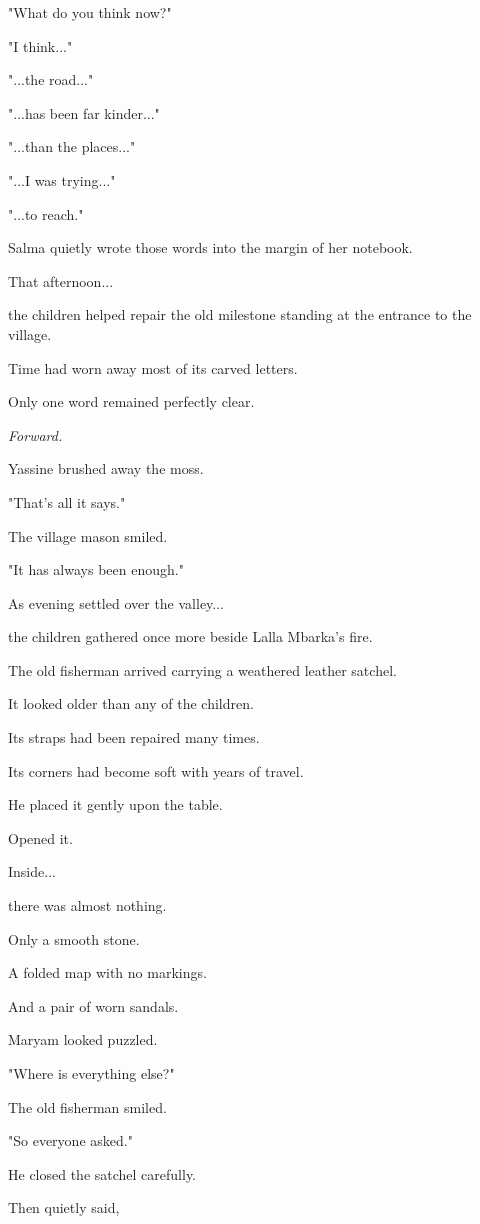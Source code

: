 \documentclass[12pt,openany]{book}
\begin{document}
"What do you think now?"

"I think..."

"...the road..."

"...has been far kinder..."

"...than the places..."

"...I was trying..."

"...to reach."

Salma quietly wrote those words into the margin of her notebook.

That afternoon...

the children helped repair the old milestone standing at the entrance to the village.

Time had worn away most of its carved letters.

Only one word remained perfectly clear.

\emph{Forward.}

Yassine brushed away the moss.

"That's all it says."

The village mason smiled.

"It has always been enough."

As evening settled over the valley...

the children gathered once more beside Lalla Mbarka's fire.

The old fisherman arrived carrying a weathered leather satchel.

It looked older than any of the children.

Its straps had been repaired many times.

Its corners had become soft with years of travel.

He placed it gently upon the table.

Opened it.

Inside...

there was almost nothing.

Only a smooth stone.

A folded map with no markings.

And a pair of worn sandals.

Maryam looked puzzled.

"Where is everything else?"

The old fisherman smiled.

"So everyone asked."

He closed the satchel carefully.

Then quietly said,
\end{document}
